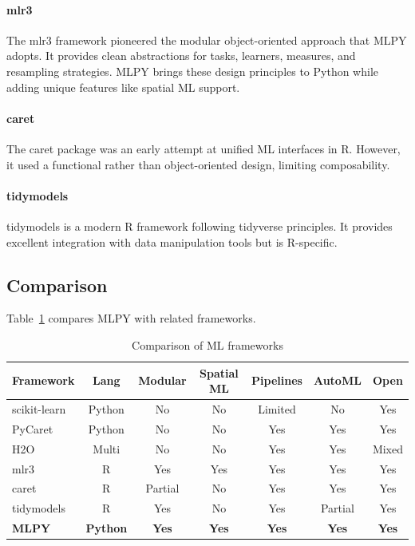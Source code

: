 \documentclass[twoside,11pt]{article}
\begin{document}
\paragraph{mlr3}
The mlr3 framework \citep{lang2019mlr3} pioneered the modular object-oriented
approach that MLPY adopts. It provides clean abstractions for tasks, learners,
measures, and resampling strategies. MLPY brings these design principles to
Python while adding unique features like spatial ML support.

\paragraph{caret}
The caret package \citep{kuhn2008caret} was an early attempt at unified ML
interfaces in R. However, it used a functional rather than object-oriented
design, limiting composability.

\paragraph{tidymodels}
tidymodels \citep{tidymodels} is a modern R framework following tidyverse
principles. It provides excellent integration with data manipulation tools but
is R-specific.

\subsection{Comparison}

Table~\ref{tab:comparison} compares MLPY with related frameworks.

\begin{table}[h]
\centering
\caption{Comparison of ML frameworks}
\label{tab:comparison}
\begin{tabular}{lcccccc}
\toprule
Framework & Lang & Modular & Spatial ML & Pipelines & AutoML & Open \\
\midrule
scikit-learn & Python & No & No & Limited & No & Yes \\
PyCaret & Python & No & No & Yes & Yes & Yes \\
H2O & Multi & No & No & Yes & Yes & Mixed \\
mlr3 & R & Yes & Yes & Yes & Yes & Yes \\
caret & R & Partial & No & Yes & Yes & Yes \\
tidymodels & R & Yes & No & Yes & Partial & Yes \\
\midrule
\textbf{MLPY} & \textbf{Python} & \textbf{Yes} & \textbf{Yes} & \textbf{Yes} & \textbf{Yes} & \textbf{Yes} \\
\bottomrule
\end{tabular}
\end{table}
\end{document}
